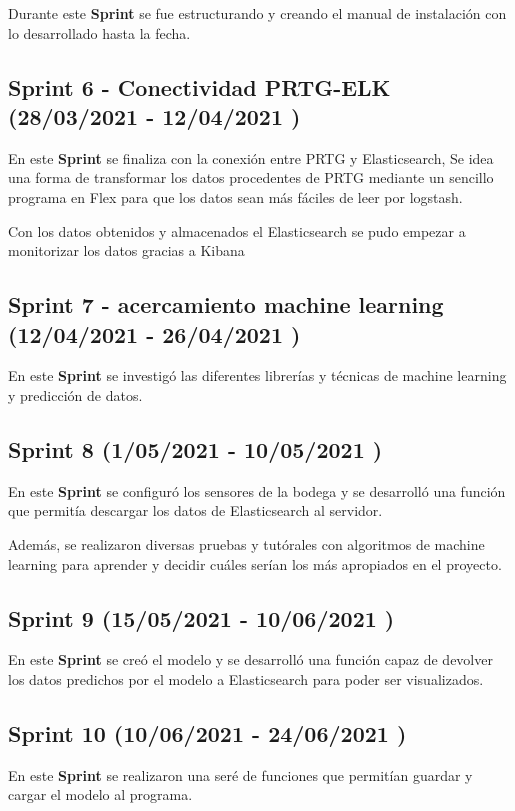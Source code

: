 Durante este \textbf{Sprint} se fue estructurando y creando el manual de instalación con lo desarrollado hasta la fecha.

\subsection{Sprint 6 - Conectividad PRTG-ELK (28/03/2021 - 12/04/2021 )}
En este \textbf{Sprint} se finaliza con la conexión entre PRTG y Elasticsearch, Se idea una forma de transformar los datos procedentes de PRTG mediante un sencillo programa en Flex para que los datos sean más fáciles de leer por logstash.

Con los datos obtenidos y almacenados el Elasticsearch se pudo empezar a monitorizar los datos gracias a Kibana

\subsection{Sprint 7 - acercamiento machine learning  (12/04/2021 - 26/04/2021 )}
En este \textbf{Sprint} se investigó las diferentes librerías y técnicas  
de machine learning y predicción de datos.

\subsection{Sprint 8 (1/05/2021 - 10/05/2021 )}
En este \textbf{Sprint} se configuró los sensores de la bodega y se desarrolló una función que permitía descargar los datos de Elasticsearch al servidor.

Además, se realizaron diversas pruebas y tutórales con algoritmos de machine learning para aprender y decidir cuáles serían los más apropiados en el proyecto.

\subsection{Sprint 9   (15/05/2021 - 10/06/2021 )}

En este \textbf{Sprint} se creó el modelo y se desarrolló una función capaz de devolver los datos predichos por el modelo a Elasticsearch para poder ser visualizados.

\subsection{Sprint 10  (10/06/2021 - 24/06/2021 )}
En este \textbf{Sprint} se realizaron una seré de funciones que permitían guardar y cargar el modelo al programa.

